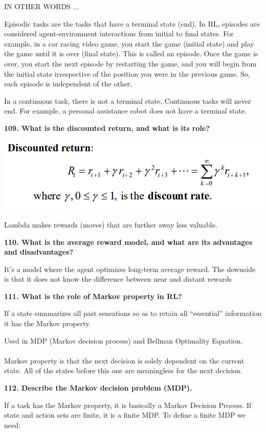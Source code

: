 IN OTHER WORDS ...

Episodic tasks are the tasks that have a terminal state (end). In RL,
episodes are considered agent-environment interactions from initial to
final states. For example, in a car racing video game, you start the
game (initial state) and play the game until it is over (final state).
This is called an episode. Once the game is over, you start the next
episode by restarting the game, and you will begin from the initial
state irrespective of the position you were in the previous game. So,
each episode is independent of the other.

In a continuous task, there is not a terminal state. Continuous tasks
will never end. For example, a personal assistance robot does not have a
terminal state.

\textbf{109. What is the discounted return, and what is its role?}

\includegraphics[width=\columnwidth]{media/image26.png}

Lambda makes rewards (moves) that are further away less valuable.

\textbf{110. What is the average reward model, and what are its
advantages and disadvantages?}

It's a model where the agent optimizes long-term average reward. The
downside is that it does not know the difference between near and
distant rewards

\textbf{111. What is the role of Markov property in RL?}

If a state summarizes all past sensations so as to retain all
``essential'' information it has the Markov property.

Used in MDP (Markov decision process) and Bellman Optimality Equation.\\
~\\
Markov property is that the next decision is solely dependent on the
current state. All of the states before this one are meaningless for the
next decision.

\textbf{112. Describe the Markov decision problem (MDP).}

If a task has the Markov property, it is basically a Markov Decision
Process. If state and action sets are finite, it is a finite MDP. To
define a finite MDP we need:

